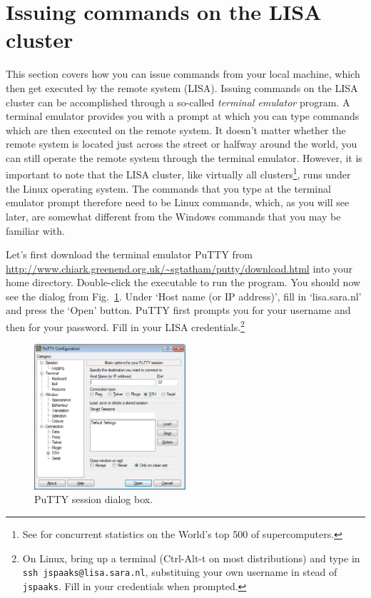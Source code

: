 \section{Issuing commands on the LISA cluster}
This section covers how you can issue commands from your local machine, which then get executed by the remote system (LISA). Issuing commands on the LISA cluster can be accomplished through a so-called \textit{terminal emulator} program. A terminal emulator provides you with a prompt at which you can type commands which are then executed on the remote system. It doesn't matter whether the remote system is located just across the street or halfway around the world, you can still operate the remote system through the terminal emulator. However, it is important to note that the LISA cluster, like virtually all clusters\footnote{See  for concurrent statistics on the World's top 500 of supercomputers.}, runs under the Linux operating system. The commands that you type at the terminal emulator prompt therefore need to be Linux commands, which, as you will see later, are somewhat different from the Windows commands that you may be familiar with.

%
Let's first download the terminal emulator PuTTY from \url{http://www.chiark.greenend.org.uk/~sgtatham/putty/download.html} into your home directory. Double-click the executable to run the program. You should now see the dialog from Fig.~\ref{fig:putty-session-dialog}. Under `Host name (or IP address)', fill in `lisa.sara.nl' and press the `Open' button. PuTTY first prompts you for your username and then for your password. Fill in your LISA credentials.\footnote{On Linux, bring up a terminal (Ctrl-Alt-t on most distributions) and type in \texttt{ssh jspaaks@lisa.sara.nl}, substituing your own username in stead of \texttt{jspaaks}. Fill in your credentials when prompted.}

\begin{figure}[htbp]
  \centering
    \includegraphics[width=0.5\textwidth]{./../eps/putty-session-dialog.eps}
  \caption{PuTTY session dialog box.}
  \label{fig:putty-session-dialog}
\end{figure}


